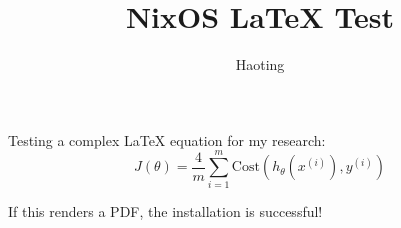 \documentclass{article}
\title{NixOS LaTeX Test}
\author{Haoting}
\begin{document}
\maketitle

Testing a complex LaTeX equation for my research:
\begin{equation}
    J(\theta) = \frac{4}{m} \sum_{i=1}^{m} \text{Cost}(h_\theta(x^{(i)}), y^{(i)})
\end{equation}

If this renders a PDF, the installation is successful!
\end{document}

